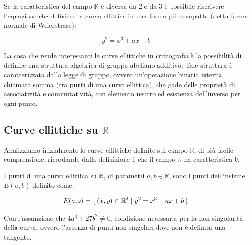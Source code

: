\documentclass{article}
\begin{document}
	Se la caratteristica del campo $\mathbb{K}$ è diversa da 2 e da 3 è possibile riscrivere l'equazione che definisce la curva ellittica in una forma più compatta (detta forma normale di Weierstrass):
	
	\begin{equation}
	y^{2} = x^{3} + ax + b
	\end{equation}
	
	La cosa che rende interessanti le curve ellittiche in crittografia è la possibilità di definire una struttura algebrica di gruppo abeliano additivo.
	Tale struttura è caratterizzata dalla legge di gruppo, ovvero un'operazione binaria interna chiamata somma (tra punti di una curva ellittica), che gode delle proprietà di associatività e commutatività, con elemento neutro ed esistenza dell'inverso per ogni punto.
	
	\subsection{Curve ellittiche su $\mathbb{R}$}
	
	Analizziamo inizialmente le curve ellittiche definite sul campo $\mathbb{R}$, di più facile comprensione, ricordando dalla definizione 1 che il campo $\mathbb{R}$ ha caratteristica 0.
	
	I punti di una curva ellittica su $\mathbb{R}$, di parametri $a, b \in \mathbb{R}$, sono i punti dell'insieme $E(a,b)$ definito come:
	
	\begin{equation}
	E(a,b) = \set{ (x,y) \in \mathbb{R}^2 | y^{2} = x^{3} + ax + b }
	\end{equation}
	
	Con l'assunzione che $4a^{3} + 27b^{2} \neq 0$, 
	condizione necessaria per la non singolarità della curva, ovvero l'assenza di punti non singolari dove non è definita una tangente.
	
\end{document}
